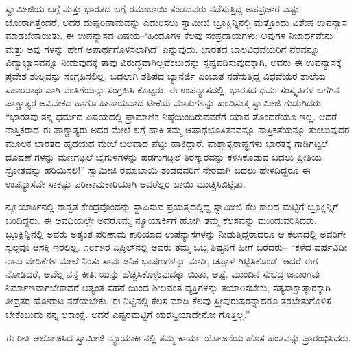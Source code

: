 ಸ್ವಾಮೀಜಿಯ ಬಗ್ಗೆ ಮತ್ತು ಭಾರತದ ಬಗ್ಗೆ ರಮಾಬಾಯಿ ತಂಡದವರು ನಡೆಸುತ್ತಿದ್ದ ಅಪಪ್ರಚಾರ ಎಷ್ಟು ಜೋರಾಗಿತ್ತೆಂದರೆ, ಅದರ ದುಷ್ಪರಿಣಾಮವನ್ನು ಎದುರಿಸಲು ಸ್ವಾಮೀಜಿ ಬ್ರೂಕ್ಲಿನ್ನಿನಲ್ಲಿ ಮತ್ತೊಂದು ವಿಶೇಷ ಉಪನ್ಯಾಸ ಮಾಡಬೇಕಾಯಿತು. ಈ ಉಪನ್ಯಾಸದ ವಿಷಯ–‘ಹಿಂದೂಗಳ ಕೆಲವು ಸಂಪ್ರದಾಯಗಳು: ಅವುಗಳ ನಿಜಾರ್ಥವೇನು ಮತ್ತು ಅವು ಗಳನ್ನು ಹೇಗೆ ಅಪಾರ್ಥಗೊಳಿಸಲಾಗಿದೆ’ ಎನ್ನುವುದು. ಭಾರತದ ಬಾಲವಿಧವೆಯರಿಗೆ ನೆರವನ್ನೂ ವಿದ್ಯಾಭ್ಯಾಸವನ್ನೂ ನೀಡುವುದಕ್ಕೆ ತಾವು ವಿರುದ್ಧವಾಗಿಲ್ಲವೆಂಬುದನ್ನು ಸ್ಪಷ್ಟಪಡಿಸುವುದಕ್ಕಾಗಿ, ಅವರು ಈ ಉಪನ್ಯಾಸಕ್ಕೆ ಪ್ರವೇಶ ಶುಲ್ಕವನ್ನು ಸಂಗ್ರಹಿಸಲಿಲ್ಲ; ಬದಲಾಗಿ ಶಶಿಪದ ಬ್ಯಾನರ್ಜಿ ಎಂಬಾತ ನಡೆಸುತ್ತಿದ್ದ ವಿಧವೆಯರ ಶಾಲೆಯ ಸಹಾಯಾರ್ಥವಾಗಿ ವಂತಿಗೆಯನ್ನು ಸಂಗ್ರಹಿಸಿ ಕೊಟ್ಟರು. ಈ ಉಪನ್ಯಾಸದಲ್ಲಿ, ಭಾರತದ ಧರ್ಮಸಂಸ್ಕೃತಿಗಳ ಬಗೆಗಿನ ಪಾಶ್ಚಾತ್ಯರ ಅವಿವೇಕದ ಹಾಗೂ ಹೀನಾಯವಾದ ಟೀಕೆಯ ಮಾತುಗಳನ್ನು ಖಂಡಿಸುತ್ತ ಸ್ವಾಮೀಜಿ ಗುಡುಗಿದರು– “ಭಾರತವು ತನ್ನ ಧರ್ಮದ ವಿಷಯದಲ್ಲಿ ಪ್ರಾಮಾಣಿಕ ನಿಷ್ಠೆಯಿಂದಿರುವವರೆಗೆ ಯಾವ ತೊಂದರೆಯೂ ಇಲ್ಲ. ಆದರೆ ನಾಸ್ತಿಕರಾದ ಈ ಪಾಶ್ಚಾತ್ಯರು ಅದರ ಮೇಲೆ ಲಗ್ಗೆ ಹಾಕಿ ತಮ್ಮ ಆಷಾಢಭೂತಿತನವನ್ನೂ ನಾಸ್ತಿಕತೆಯನ್ನೂ ತುಂಬುವುದರ ಮೂಲಕ ಭಾರತದ ಹೃದಯದ ಮೇಲೆ ಬಲವಾದ ಪೆಟ್ಟು ಹಾಕಿದ್ದಾರೆ. ಪಾಶ್ಚಾತ್ಯರಾಷ್ಟ್ರಗಳು ಭಾರತಕ್ಕೆ ಗಾಡಿಗಟ್ಟಲೆ ದೂಷಣೆ ಗಳನ್ನು ಮಣಗಟ್ಟಲೆ ಬೈಗುಳಗಳನ್ನು ಹಡಗುಗಟ್ಟಲೆ ತಿರಸ್ಕಾರವನ್ನು ಕಳಿಸಿಕೊಡುವ ಬದಲು ಪ್ರೀತಿಯ ಸ್ರೋತವನ್ನು ಹರಿಯಿಸಲಿ!” ಸ್ವಾಮೀಜಿ ರಮಾಬಾಯಿ ತಂಡದವರಿಗೆ ನೇರವಾಗಿ ಬದಲು ಹೇಳದಿದ್ದರೂ ಈ ಉಪನ್ಯಾಸವೇ ಸಾಕಷ್ಟು ಪರಿಣಾಮಕಾರಿಯಾಗಿ ಅವರೆಲ್ಲರ ಬಾಯಿ ಮುಚ್ಚಿಸಿಬಿಟ್ಟಿತು.

ನ್ಯೂಯಾರ್ಕಿನಲ್ಲಿ ಶಾಶ್ವತ ಕೇಂದ್ರವೊಂದನ್ನು ಸ್ಥಾಪಿಸುವ ಪ್ರಯತ್ನದಲ್ಲಿದ್ದ ಸ್ವಾಮೀಜಿ ಕೆಲ ಕಾಲದ ಮಟ್ಟಿಗೆ ಬ್ರೂಕ್ಲಿನ್ನಿಗೆ ಬಂದಿದ್ದರು. ಈ ಅವಧಿಯಲ್ಲೇ ಅವರೊಮ್ಮೆ ನ್ಯೂಯಾರ್ಕಿಗೆ ಹೋಗಿ ತಮ್ಮ ಕೆಲಸವನ್ನು ಮುಂದುವರಿಸಿದರು. ಬ್ರೂಕ್ಲಿನ್ನಿನಲ್ಲಿ ಅವರು ಅತ್ಯಂತ ಪರಿಣಾಮ ಕಾರಿಯಾದ ಉಪನ್ಯಾಸಗಳನ್ನು ನೀಡುತ್ತಿದ್ದರಾದರೂ ಆ ಕೆಲಸದಲ್ಲಿ ಅವರಿಗೇ ಸ್ವಲ್ಪವೂ ಆಸಕ್ತಿ ಇರಲಿಲ್ಲ. ೧೮೯೫ರ ಏಪ್ರಿಲ್​ನಲ್ಲಿ ಅವರು ತಮ್ಮ ಒಬ್ಬ ಶಿಷ್ಯನಿಗೆ ಹೀಗೆ ಬರೆದರು– “ಕಳೆದ ವರ್ಷವಿಡೀ ನಾನು ವೇದಿಕೆಗಳ ಮೇಲೆ ನಿಂತು ಸಾರ್ವಜನಿಕ ಭಾಷಣಗಳನ್ನು ಮಾಡಿ, ಚಪ್ಪಾಳೆ ಗಿಟ್ಟಿಸಿಕೊಂಡೆ. ಆದರೆ ಈಗ ನೋಡಿದರೆ, ಅವೆಲ್ಲ ನನ್ನ ಕೀರ್ತಿಯನ್ನು ಹೆಚ್ಚಿಸಿಕೊಳ್ಳುವುದಕ್ಕಾ ಯಿತು, ಅಷ್ಟೆ. ಮುಂದಿನ ಸುಭದ್ರ ಜನಾಂಗವು ನಿರ್ಮಾಣವಾಗಬೇಕಾದರೆ ಅತ್ಯಂತ ಸಹನೆ ಯಿಂದ ಶೀಲವಂತ ವ್ಯಕ್ತಿಗಳನ್ನು ತಯಾರಿಸಬೇಕು, ಸತ್ಯಸಾಕ್ಷಾತ್ಕಾರಕ್ಕಾಗಿ ತೀವ್ರತರ ಹೋರಾಟ ನಡೆಯಬೇಕು. ಈ ನಿಟ್ಟಿನಲ್ಲಿ ಕೆಲಸ ಮಾಡಿ ಕೆಲವು ಸ್ತ್ರೀಪುರುಷರನ್ನಾದರೂ ತರಬೇತುಗೊಳಿಸ ಬೇಕೆಂಬುದು ನನ್ನ ಆಕಾಂಕ್ಷೆ. ಆದರೆ ಎಷ್ಟರಮಟ್ಟಿಗೆ ಯಶಸ್ವಿಯಾದೇನೋ ಗೊತ್ತಿಲ್ಲ.”

ಈ ರೀತಿ ಆಲೋಚಿಸಿದ ಸ್ವಾಮೀಜಿ ನ್ಯೂಯಾರ್ಕಿನಲ್ಲಿ ತಮ್ಮ ಕಾರ್ಯ ಯೋಜನೆಯ ಹೊಸ ಹಂತವನ್ನು ಪ್ರಾರಂಭಿಸಿದರು.


